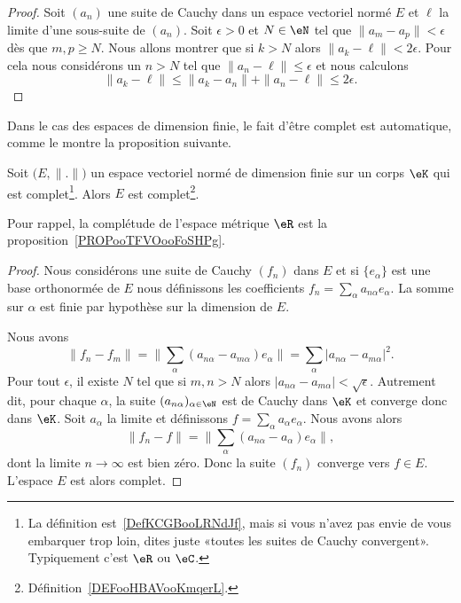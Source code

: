 \begin{proof}
	Soit \( (a_n)\) une suite de Cauchy dans un espace vectoriel normé \( E\) et \( \ell\) la limite d'une sous-suite de \( (a_n)\). Soit \( \epsilon>0\) et \( N\in \eN\) tel que \( \| a_m-a_p \|<\epsilon\) dès que \( m,p\geq N\). Nous allons montrer que si \( k>N\) alors \( \| a_k-\ell \|<2\epsilon\). Pour cela nous considérons un \( n>N\) tel que \( \| a_n-\ell \|\leq \epsilon\) et nous calculons
	\begin{equation}
		\| a_k-\ell \|\leq \| a_k-a_n \|+\| a_n-\ell \|\leq 2\epsilon.
	\end{equation}
\end{proof}

Dans le cas des espaces de dimension finie, le fait d'être complet est automatique, comme le montre la proposition suivante.
\begin{proposition}     \label{PROPooGJDTooXOoYfw}
	Soit \( \big( E,\| . \| \big)\) un espace vectoriel normé de dimension finie sur un corps \( \eK\) qui est complet\footnote{La définition est~\ref{DefKCGBooLRNdJf}, mais si vous n'avez pas envie de vous embarquer trop loin, dites juste «toutes les suites de Cauchy convergent». Typiquement c'est \( \eR\) ou \( \eC\).}. Alors \( E\) est complet\footnote{Définition~\ref{DEFooHBAVooKmqerL}.}.
\end{proposition}
Pour rappel, la complétude de l'espace métrique \( \eR\) est la proposition~\ref{PROPooTFVOooFoSHPg}.

\begin{proof}
	Nous considérons une suite de Cauchy \( (f_n)\) dans \( E\) et si \( \{ e_{\alpha} \} \) est une base orthonormée de \( E\) nous définissons les coefficients \( f_n=\sum_{\alpha}a_{n\alpha}e_{\alpha} \). La somme sur \( \alpha\) est finie par hypothèse sur la dimension de \( E\).

	Nous avons
	\begin{equation}
		\| f_n-f_m \|=\| \sum_{\alpha}(a_{n\alpha}-a_{m\alpha})e_{\alpha} \|=\sum_{\alpha}| a_{n\alpha}-a_{m\alpha} |^2.
	\end{equation}
	Pour tout \( \epsilon\), il existe \( N\) tel que si \( m,n>N\) alors \( | a_{n\alpha}-a_{m\alpha} |<\sqrt{ \epsilon }\). Autrement dit, pour chaque \( \alpha\), la suite \( (a_{n\alpha})_{\alpha\in \eN}\) est de Cauchy dans \( \eK\) et converge donc dans \( \eK\). Soit \( a_{\alpha}\) la limite et définissons \( f=\sum_{\alpha}a_{\alpha}e_{\alpha}\). Nous avons alors
	\begin{equation}
		\| f_n-f \|=\| \sum_{\alpha}(a_{n\alpha}-a_{\alpha})e_{\alpha} \|,
	\end{equation}
	dont la limite \( n\to \infty\) est bien zéro. Donc la suite \( (f_n)\) converge vers \( f\in E\). L'espace \( E\) est alors complet.
\end{proof}




